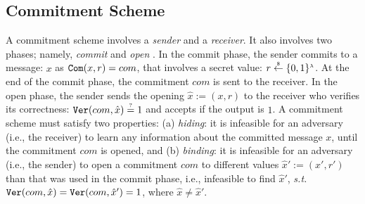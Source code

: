 


\vs

\subsection{Commitment Scheme}\label{subsec:commit}

\svs

 A commitment scheme involves a  \emph{sender} and a \emph{receiver}. It also  involves  two phases; namely, \emph{commit} and  \emph{open} \cite{DBLP:books/cu/Goldreich2004}. In the commit phase, the sender commits to a message: $x$ as $\mathtt{Com}(x,r)=com$, that involves a secret value: $r\stackrel{\scriptscriptstyle\$}\leftarrow \{0,1\}^{\scriptscriptstyle\lambda}$. At the end of the commit phase,  the commitment ${com}$ is sent to the receiver. In the open phase, the sender sends the opening $\hat{x}:=(x, r)$ to the receiver who verifies its correctness: $\mathtt{Ver}({com},\hat{x})\stackrel{\scriptscriptstyle ?}=1$ and accepts if the output is $1$.  A commitment scheme must satisfy two properties: (a) \textit{hiding}: it is infeasible for an adversary (i.e., the receiver) to learn any information about the committed  message $x$, until the commitment ${com}$ is opened, and (b) \textit{binding}: it is infeasible for an adversary (i.e., the sender) to open a commitment ${com}$ to different values $\hat{x}':=(x',r')$ than that was  used in the commit phase, i.e., infeasible to find  $\hat{x}'$, \textit{s.t.} $\mathtt{Ver}({com},\hat{x})=\mathtt{Ver}({com},\hat{x}')=1$, where $\hat{x}\neq \hat{x}'$.  %